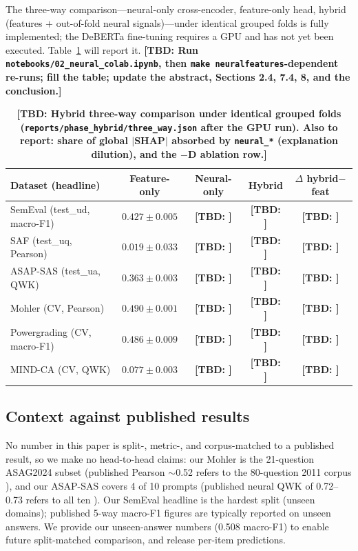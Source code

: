 \documentclass[11pt]{article}
\newcommand{\TBD}[1]{\textbf{[TBD: #1]}}
\begin{document}
The three-way comparison---neural-only cross-encoder, feature-only head,
hybrid (features $+$ out-of-fold neural signals)---under identical grouped
folds is fully implemented; the DeBERTa fine-tuning requires a GPU and has not
yet been executed. Table~\ref{tab:hybrid} will report it.
\TBD{Run \texttt{notebooks/02\_neural\_colab.ipynb}, then \texttt{make
neuralfeatures}-dependent re-runs; fill the table; update the abstract,
Sections 2.4, 7.4, 8, and the conclusion.}

\begin{table}[t]
\centering\small
\begin{tabular}{lcccc}
\toprule
Dataset (headline) & Feature-only & Neural-only & Hybrid & $\Delta$ hybrid$-$feat \\
\midrule
SemEval (test\_ud, macro-F1) & $0.427\pm0.005$ & \TBD{} & \TBD{} & \TBD{} \\
SAF (test\_uq, Pearson)      & $0.019\pm0.033$ & \TBD{} & \TBD{} & \TBD{} \\
ASAP-SAS (test\_ua, QWK)     & $0.363\pm0.003$ & \TBD{} & \TBD{} & \TBD{} \\
Mohler (CV, Pearson)         & $0.490\pm0.001$ & \TBD{} & \TBD{} & \TBD{} \\
Powergrading (CV, macro-F1)  & $0.486\pm0.009$ & \TBD{} & \TBD{} & \TBD{} \\
MIND-CA (CV, QWK)            & $0.077\pm0.003$ & \TBD{} & \TBD{} & \TBD{} \\
\bottomrule
\end{tabular}
\caption{\TBD{Hybrid three-way comparison under identical grouped folds
(\texttt{reports/phase\_hybrid/three\_way.json} after the GPU run). Also to
report: share of global $|$SHAP$|$ absorbed by \texttt{neural\_*} (explanation
dilution), and the $-$D ablation row.}}
\label{tab:hybrid}
\end{table}

\subsection{Context against published results}
\label{sec:results-context}

No number in this paper is split-, metric-, and corpus-matched to a published
result, so we make no head-to-head claims: our Mohler is the 21-question
ASAG2024 subset (published Pearson $\sim$0.52 refers to the 80-question 2011
corpus \cite{mohler2011learning}), and our ASAP-SAS covers 4 of 10 prompts
(published neural QWK of 0.72--0.73 refers to all ten
\cite{riordan2017investigating}). Our SemEval headline is the hardest split
(unseen domains); published 5-way macro-F1 figures are typically reported on
unseen answers. We provide our unseen-answer numbers (0.508 macro-F1) to
enable future split-matched comparison, and release per-item predictions.
\end{document}
